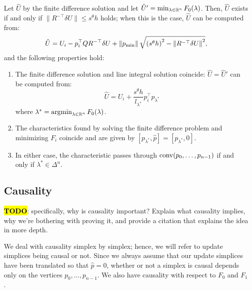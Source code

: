 \documentclass[sisc-eikonal.tex]{subfiles}
\begin{document}
\begin{theorem}\label{thm:equivalence}
  Let $\hat{U}$ by the finite difference solution and let
  $\hat{U}' = \min_{\lambda \in \mathbb{R}^n} F_0(\lambda)$. Then, $\hat{U}$
  exists if and only if $\|R^{-\top} \delta U\| \leq s^\theta h$
  holds; when this is the case, $\hat{U}$ can be computed from:
  \begin{equation}
    \label{eq:U-finite-diff}
    \hat{U} = U_i - p_i^\top Q R^{-\top} \delta U + \norm{\pmin} \sqrt{{(s^\theta h)}^2 - \norm{R^{-\top} \delta U}^2},
  \end{equation}
  and the following properties hold:
  \begin{enumerate}
  \item The finite difference solution and line integral solution
    coincide: $\hat{U} = \hat{U}'$ can be computed from:
    \begin{equation}
      \label{eq:U-from-Ui-exact}
      \hat{U} = U_i + \frac{s^\theta h}{l_{\lambda^*}} p_i^\top p_{\lambda^*}
    \end{equation}
    where
    $\lambda^* = \operatorname{argmin}_{\lambda \in \mathbb{R}^n}
    F_0(\lambda)$.
  \item The characteristics found by solving the finite difference
    problem and minimizing $F_i$ coincide and are given by
    $[p_{\lambda^*}, \hat{p}] = [p_{\lambda^*}, 0]$.
  \item In either case, the characteristic passes through
    $\operatorname{conv}(p_0, \hdots, p_{n-1})$ if and only if
    $\lambda^* \in \Delta^n$.
  \end{enumerate}
\end{theorem}

\subsection{Causality}\label{ssec:causality}

\hl{\textbf{TODO}}: specifically, why is causality important? Explain
what causality implies, why we're bothering with proving it, and
provide a citation that explains the idea in more depth.

We deal with causality simplex by simplex; hence, we will refer to
update simplices being causal or not. Since we always assume that our
update simplices have been translated so that $\hat{p} = 0$, whether
or not a simplex is causal depends only on the vertices
$p_0, \hdots, p_{n-1}$. We also have causality with respect to $F_0$
and $F_1$.
\end{document}
